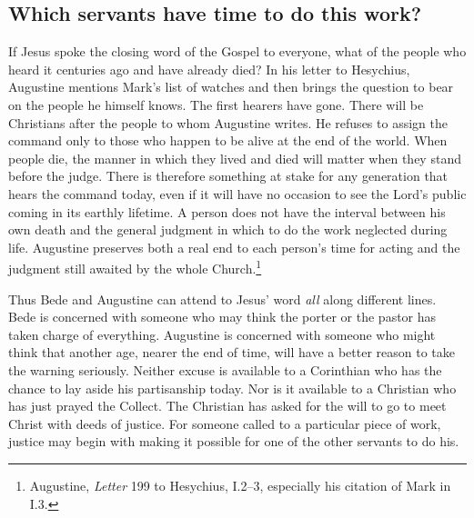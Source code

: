 \subsection{Which servants have time to do this work?}

If Jesus spoke the closing word of the Gospel to everyone, what of the people who heard it centuries ago and have already died? In his letter to Hesychius, Augustine mentions Mark's list of watches and then brings the question to bear on the people he himself knows. The first hearers have gone. There will be Christians after the people to whom Augustine writes. He refuses to assign the command only to those who happen to be alive at the end of the world. When people die, the manner in which they lived and died will matter when they stand before the judge. There is therefore something at stake for any generation that hears the command today, even if it will have no occasion to see the Lord's public coming in its earthly lifetime. A person does not have the interval between his own death and the general judgment in which to do the work neglected during life. Augustine preserves both a real end to each person's time for acting and the judgment still awaited by the whole Church.\footnote{Augustine, \textit{Letter} 199 to Hesychius, I.2--3, especially his citation of Mark in I.3.}

Thus Bede and Augustine can attend to Jesus' word \emph{all} along different lines. Bede is concerned with someone who may think the porter or the pastor has taken charge of everything. Augustine is concerned with someone who might think that another age, nearer the end of time, will have a better reason to take the warning seriously. Neither excuse is available to a Corinthian who has the chance to lay aside his partisanship today. Nor is it available to a Christian who has just prayed the Collect. The Christian has asked for the will to go to meet Christ with deeds of justice. For someone called to a particular piece of work, justice may begin with making it possible for one of the other servants to do his.

